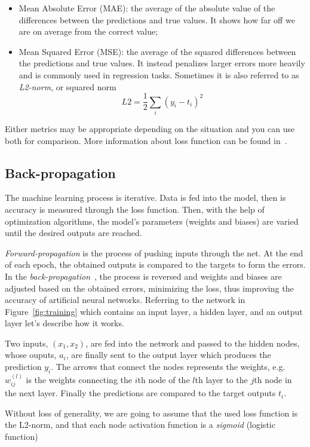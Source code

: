 \begin{itemize}
\tightlist
\item Mean Absolute Error (MAE): the average of the absolute value of the differences between the predictions and true values. It shows how far off we are on average from the correct value;
\item Mean Squared Error (MSE): the average of the squared differences between the predictions and true values. It instead penalizes larger errors more heavily and is commonly used in regression tasks. Sometimes it is also referred to as \emph{L2-norm}, or squared norm
\begin{equation}
	L2 = \frac{1}{2}\sum_i (y_i - t_i)^2
\end{equation} 
\end{itemize}
Either metrics may be appropriate depending on the situation and you can use both for comparison. More information about loss function can be found in~\cite{bib:loss_function}.

\subsection{Back-propagation}
The machine learning process is iterative. Data is fed into the model, then is accuracy is measured through the loss function. Then, with the help of optimization algorithms, the model’s parameters (weights and biases) are varied until the desired outputs are reached.

\emph{Forward-propagation} is the process of pushing inputs through the net. At the end of each epoch, the obtained outputs is compared to the targets to form the errors. In the \emph{back-propagation}~\cite{bib:backpropagation}, the process is reversed and weights and biases are adjusted based on the obtained errors, minimizing the loss, thus improving the accuracy of artificial neural networks.
Referring to the network in Figure~\ref{fig:training} which contains an input layer, a hidden layer, and an output layer let's describe how it works.

Two inputs, $(x_1, x_2)$, are fed into the network and passed to the hidden nodes, whose ouputs, $a_i$, are finally sent to the output layer which produces the prediction $y_i$. The arrows that connect the nodes represents the weights, e.g. $w^{(l)}_{ij}$ is the weights connecting the $i$th node of the $l$th layer to the $j$th node in the next layer. Finally the predictions are compared to the target outputs $t_i$. 

Without loss of generality, we are going to assume that the used loss function is the L2-norm, and that each node activation function is a \emph{sigmoid} (logistic function)

